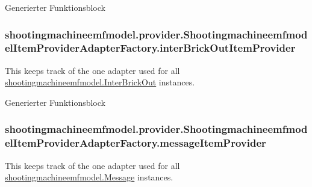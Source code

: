 Generierter Funktionsblock \hypertarget{classshootingmachineemfmodel_1_1provider_1_1_shootingmachineemfmodel_item_provider_adapter_factory_a9d5484430c534ce8e7aaf79954f19fab}{
\subsubsection[{inter\-Brick\-Out\-Item\-Provider}]{ shootingmachineemfmodel.\-provider.\-Shootingmachineemfmodel\-Item\-Provider\-Adapter\-Factory.\-inter\-Brick\-Out\-Item\-Provider\hspace{0.3cm}{\ttfamily [protected]}}}\label{classshootingmachineemfmodel_1_1provider_1_1_shootingmachineemfmodel_item_provider_adapter_factory_a9d5484430c534ce8e7aaf79954f19fab}
This keeps track of the one adapter used for all \hyperlink{interfaceshootingmachineemfmodel_1_1_inter_brick_out}{shootingmachineemfmodel.\-Inter\-Brick\-Out} instances.

Generierter Funktionsblock \hypertarget{classshootingmachineemfmodel_1_1provider_1_1_shootingmachineemfmodel_item_provider_adapter_factory_a5abcc88127ed58f98c7e73dcb79a4a80}{
\subsubsection[{message\-Item\-Provider}]{ shootingmachineemfmodel.\-provider.\-Shootingmachineemfmodel\-Item\-Provider\-Adapter\-Factory.\-message\-Item\-Provider\hspace{0.3cm}{\ttfamily [protected]}}}\label{classshootingmachineemfmodel_1_1provider_1_1_shootingmachineemfmodel_item_provider_adapter_factory_a5abcc88127ed58f98c7e73dcb79a4a80}
This keeps track of the one adapter used for all \hyperlink{interfaceshootingmachineemfmodel_1_1_message}{shootingmachineemfmodel.\-Message} instances.


